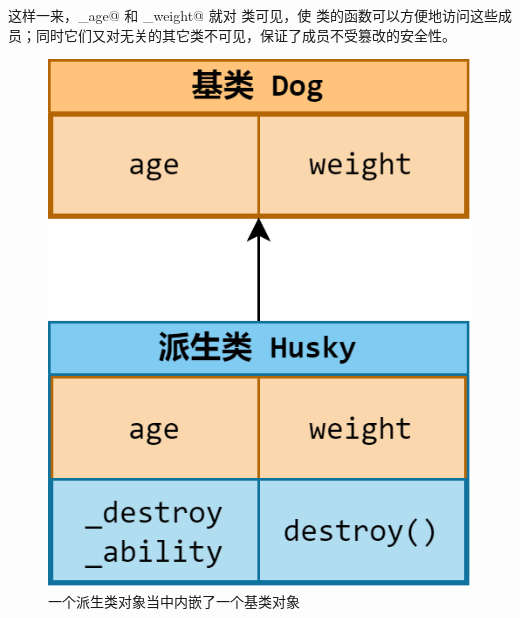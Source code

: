 这样一来，\lstinline@_age@ 和 \lstinline@_weight@ 就对 \lstinline@Husky@ 类可见，使 \lstinline@Husky@ 类的函数可以方便地访问这些成员；同时它们又对无关的其它类不可见，保证了成员不受篡改的安全性。\par
\begin{figure}[htbp]
    \centering
    \includegraphics[width=.25\textwidth]{images/generalized_parts/09_built_in_base_class_object_in_derived_class.drawio.png}
    \caption{一个派生类对象当中内嵌了一个基类对象}
\end{figure}

